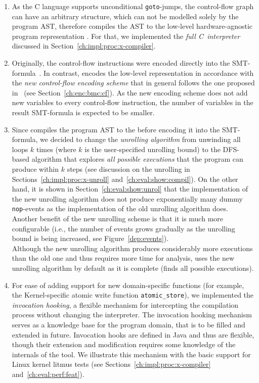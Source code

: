 \begin{enumerate}[label=\arabic*.]
\begin{enumerate}[label=\alph*.]
  \item As the C language supports unconditional \texttt{goto}-jumps, the control-flow graph can have an arbitrary structure, which can not be modelled solely by the program AST, therefore \porthos[2] compiles the AST to the low-level hardware-agnostic program representation \xgraph{}.
  For that, we implemented the \textit{full C~interpreter} discussed in Section~\ref{ch:impl:proc:x-compiler}.
  
  \item Originally, the control-flow instructions were encoded directly into the SMT-formula~\cite{Porthos17a}.
  In contrast, \porthos[2] encodes the low-level \xgraph{} representation in accordance with the \textit{new control-flow encoding scheme} that in general follows the one proposed in~\cite[Chapter 5.1.2]{heljanko2008unfoldings} (see Section~\ref{ch:enc:bmc:cf}).
  As the new encoding scheme does not add new variables to every control-flow instruction, the number of variables in the result SMT-formula is expected to be smaller.
  
  \item Since \porthos[2] compiles the program AST to the \xgraph{} before encoding it into the SMT-formula, we decided to change the \textit{unrolling algorithm} from unwinding all loops $k$ times (where $k$ is the user-specified unrolling bound) to the DFS-based algorithm that explores \textit{all possible executions} that the program can produce within $k$ steps (see discussion on the unrolling in Sections~\ref{ch:impl:proc:x-unroll} and~\ref{ch:eval:show:compil}).
  On the other hand, it is shown in Section~\ref{ch:eval:show:unrol} that the implementation of the new unrolling algorithm does not produce exponentially many dummy \texttt{nop}-events as the implementation of the old unrolling algorithm does.
  Another benefit of the new unrolling scheme is that it is much more configurable (i.e., the number of events grows gradually as the unrolling bound is being increased, see Figure~\ref{dep:events}). \\
  Although the new unrolling algorithm produces considerably more executions than the old one and thus requires more time for analysis, \porthos[2] uses the new unrolling algorithm by default as it is complete (finds all possible executions).

  \item For ease of adding support for new domain-specific functions (for example, the Kernel-specific atomic write function \texttt{atomic\_store}), we implemented the \textit{invocation hooking}, a flexible mechanism for intercepting the compilation process without changing the interpreter.
  The invocation hooking mechanism serves as a knowledge base for the program domain, that is to be filled and extended in future.
  Invocation hooks are defined in Java and thus are flexible, though their extension and modification requires some knowledge of the internals of the tool.
  We illustrate this mechanism with the basic support for Linux kernel litmus tests (see Sections~\ref{ch:impl:proc:x-compiler} and~\ref{ch:eval:perf:feat}).


\end{enumerate}
\end{enumerate}
